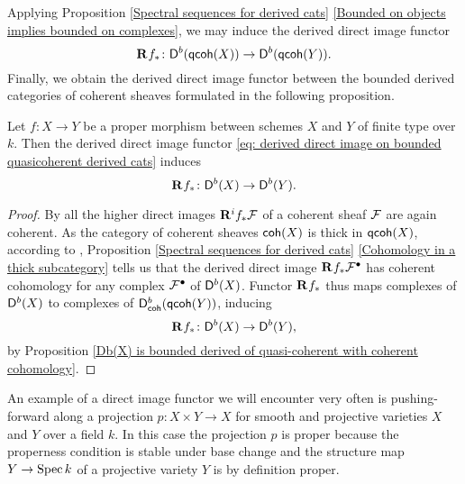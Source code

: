 \noindent
Applying Proposition \ref{Spectral sequences for derived cats} \ref{Bounded on objects implies bounded on complexes}, we may induce the derived direct image functor
\begin{equation}
    \label{eq: derived direct image on bounded quasicoherent derived cats}
    \mathbf{R}^{}f_* \colon \mathsf{D}^b(\mathsf{qcoh}(X)) \to \mathsf{D}^b(\mathsf{qcoh}(Y)).
\end{equation}
Finally, we obtain the derived direct image functor between the bounded derived categories of coherent sheaves formulated in the following proposition.
\begin{proposition}
    Let $f \colon X \to Y$ be a proper morphism between schemes $X$ and $Y$ of finite type over $k$. Then the derived direct image functor \eqref{eq: derived direct image on bounded quasicoherent derived cats} induces
    \[
        \mathbf{R}^{}f_* \colon \mathsf{D}^b(X) \to \mathsf{D}^b(Y).
    \]
\end{proposition} 

\begin{proof}
    By \cite[Part III, \S 3.2, Theorem 3.2.1]{EGA} all the higher direct images $\mathbf{R}^{i}f_*\mathcal F$ of a coherent sheaf $\mathcal F$ are again coherent. As the category of coherent sheaves $\mathsf{coh}(X)$ is thick in $\mathsf{qcoh}(X)$, according to \cite[\S II, Proposition 5.7]{Hartshorne1977}, Proposition \ref{Spectral sequences for derived cats} \ref{Cohomology in a thick subcategory} tells us that the derived direct image $\mathbf{R}^{}f_*\mathcal F^\bullet$ has coherent cohomology for any complex $\mathcal F^\bullet$ of $\mathsf{D}^b(X)$. Functor $\mathbf{R}^{}f_*$ thus maps complexes of $\mathsf{D}^b(X)$ to complexes of $\mathsf{D}^b_{\mathsf{coh}}(\mathsf{qcoh}(Y))$, inducing
    \[
        \mathbf{R}^{}f_* \colon \mathsf{D}^b(X) \to \mathsf{D}^b(Y),
    \]
    by Proposition \ref{Db(X) is bounded derived of quasi-coherent with coherent cohomology}.
\end{proof}

\begin{example}
    An example of a direct image functor we will encounter very often is pushing-forward along a projection $p \colon X \times Y \to X$ for smooth and projective varieties $X$ and $Y$ over a field $k$. In this case the projection $p$ is proper because the properness condition is stable under base change \cite[\href{https://stacks.math.columbia.edu/tag/01W4}{Tag 01W4}]{stacks-project} and the structure map $Y \to \operatorname{Spec}k$ of a projective variety $Y$ is by definition proper. 
\end{example}


